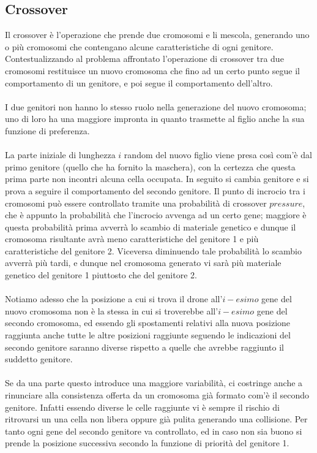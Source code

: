 \documentclass{article}
\begin{document}
\subsection{Crossover}
Il crossover è l'operazione che prende due cromosomi e li mescola, generando uno o più cromosomi che contengano alcune caratteristiche di ogni genitore. Contestualizzando al problema affrontato l'operazione di crossover tra due cromosomi restituisce un nuovo cromosoma che fino ad un certo punto segue il comportamento di un genitore, e poi segue il comportamento dell'altro.
\paragraph{}
I due genitori non hanno lo stesso ruolo nella generazione del nuovo cromosoma; uno di loro ha una maggiore impronta in quanto trasmette al figlio anche la sua funzione di preferenza.
\paragraph{}
La parte iniziale di lunghezza $i$ random del nuovo figlio viene presa così com'è dal primo genitore (quello che ha fornito la maschera), con la certezza che questa prima parte non incontri alcuna cella occupata.
In seguito si cambia genitore e si prova a seguire il comportamento del secondo genitore. Il punto di incrocio tra i cromosomi può essere controllato tramite una probabilità di crossover $pressure$, che è appunto la probabilità che l'incrocio avvenga ad un  certo gene; maggiore è questa probabilità prima avverrà lo scambio di materiale genetico e dunque il cromosoma risultante avrà meno caratteristiche del genitore 1 e più caratteristiche del genitore 2. Viceversa diminuendo tale probabilità lo scambio avverrà più tardi, e dunque nel cromosoma generato vi sarà più materiale genetico del genitore 1 piuttosto che del genitore 2.
\paragraph{}
Notiamo adesso che la posizione a cui si trova il drone all'$i-esimo$ gene del nuovo cromosoma non è la stessa in cui si troverebbe all'$i-esimo$ gene del secondo cromosoma, ed essendo gli spostamenti relativi alla nuova posizione raggiunta anche tutte le altre posizioni raggiunte seguendo le indicazioni del secondo genitore saranno diverse rispetto a quelle che avrebbe raggiunto il suddetto genitore.
\paragraph{}
Se da una parte questo introduce una maggiore variabilità, ci costringe anche a rinunciare alla consistenza offerta da un cromosoma già formato com'è il secondo genitore. Infatti essendo diverse le celle raggiunte vi è sempre il rischio di ritrovarsi un una cella non libera oppure già pulita generando una collisione. Per tanto ogni gene del secondo genitore va controllato, ed in caso non sia buono si prende la posizione successiva secondo la funzione di priorità del genitore 1.
\end{document}
